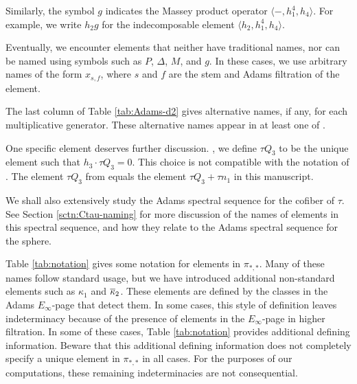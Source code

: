 Similarly, the symbol $g$ indicates the Massey product
operator $\langle -, h_1^4, h_4 \rangle$. For example, we write
$h_2 g$ for the indecomposable element $\langle h_2, h_1^4, h_4 \rangle$.

Eventually, we encounter elements that neither have traditional names,
nor can be named using symbols such as $P$, $\Delta$, $M$, and $g$.
In these cases, we use arbitrary names of the form $x_{s,f}$, where
$s$ and $f$ are the stem and Adams filtration of the element.

The last column of Table \ref{tab:Adams-d2} gives alternative names,
if any, for each multiplicative generator.  These alternative names
appear in at least one of 
\cite{Bruner97} \cite{Isaksen14c} \cite{Tangora70a}.

\begin{remark}
One specific element deserves further discussion.
,
we define $\tau Q_3$ to be the unique  element 
such that
$h_3 \cdot \tau Q_3 = 0$.
This choice is not compatible with the notation of \cite{Isaksen14c}.
The element $\tau Q_3$ from \cite{Isaksen14c} equals
the element $\tau Q_3 + \tau n_1$ in this manuscript.
\end{remark}

We shall also extensively study the Adams spectral sequence for
the cofiber of $\tau$.  See Section \ref{sctn:Ctau-naming} for
more discussion of the names of elements in this spectral sequence,
and how they relate to the Adams spectral sequence for the sphere.

Table \ref{tab:notation} gives some notation for elements in
$\pi_{*,*}$.  Many of these names follow standard usage, but we 
have introduced additional non-standard elements such as
$\kappa_1$ and $\overline{\kappa}_2$.  These elements are defined by
the classes in the Adams $E_\infty$-page that detect them.
In some cases, this style of definition leaves indeterminacy because
of the presence of elements in the $E_\infty$-page in higher filtration.
In some of these cases, Table \ref{tab:notation} provides additional
defining information.  Beware that this additional defining information
does not completely specify a unique element in $\pi_{*,*}$ in 
all cases.  For the purposes of our computations, these remaining
indeterminacies are not consequential.


